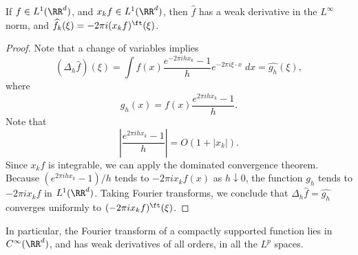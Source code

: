 \begin{theorem}
    If $f \in L^1(\RR^d)$, and $x_k f \in L^1(\RR^d)$, then $\widehat{f}$ has a weak derivative in the $L^\infty$ norm, and $\widehat{f}_k(\xi) = - 2 \pi i (x_k f)^\ft(\xi)$.
\end{theorem}
\begin{proof}
    Note that a change of variables implies
    \[ (\Delta_h \widehat{f})(\xi) = \int f(x) \frac{e^{-2\pi i h x_k} - 1}{h} e^{-2 \pi i \xi \cdot x}\; dx = \widehat{g_h}(\xi), \]
    where
    \[ g_h(x) = f(x) \frac{e^{2 \pi i h x_k} - 1}{h}. \]
    Note that
    \[ \left| \frac{e^{2 \pi i h x_k} - 1}{h} \right| = O(1 + |x_k|). \]
    Since $x_k f$ is integrable, we can apply the dominated convergence theorem. Because $(e^{2 \pi i h x_k} - 1)/h$ tends to $-2 \pi i x_k f(x)$ as $h \downarrow 0$, the function $g_h$ tends to $-2\pi i x_k f$ in $L^1(\RR^d)$. Taking Fourier transforms, we conclude that $\Delta_h \widehat{f} = \widehat{g_h}$ converges uniformly to $(-2 \pi i x_k f)^\ft(\xi)$.
\end{proof}

\begin{remark}
    In particular, the Fourier transform of a compactly supported function lies in $C^\infty(\RR^d)$, and has weak derivatives of all orders, in all the $L^p$ spaces.
\end{remark}


